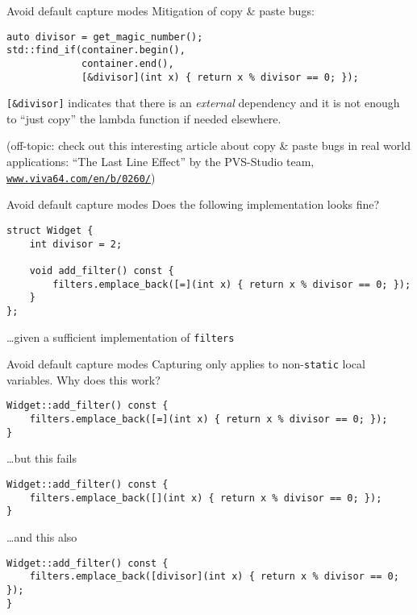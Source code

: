 \begin{frame}[fragile]{Avoid default capture modes}
    Mitigation of copy \& paste bugs:
    \begin{lstlisting}
auto divisor = get_magic_number();
std::find_if(container.begin(),
             container.end(),
             [&divisor](int x) { return x % divisor == 0; });
    \end{lstlisting}

    \texttt{[\&divisor]} indicates that there is an \textit{external} dependency and it is not enough to \enquote{just copy} the lambda function if needed elsewhere.

    {\footnotesize (off-topic: check out this interesting article about copy \& paste bugs in real world applications: \enquote{The Last Line Effect} by the PVS-Studio team, \href{https://www.viva64.com/en/b/0260/}{\texttt{www.viva64.com/en/b/0260/}})}  
\end{frame}

\begin{frame}[fragile]{Avoid default capture modes}
    Does the following implementation looks fine?
    \begin{lstlisting}
struct Widget {
    int divisor = 2;

    void add_filter() const {
        filters.emplace_back([=](int x) { return x % divisor == 0; });
    }
};
    \end{lstlisting}
    \hfill \ldots given a sufficient implementation of \texttt{filters}

\end{frame}

\begin{frame}[fragile]{Avoid default capture modes}
    Capturing only applies to non-\texttt{static} local variables. Why does this work?
    \begin{lstlisting}
Widget::add_filter() const {
    filters.emplace_back([=](int x) { return x % divisor == 0; });
}
    \end{lstlisting}
    \ldots but this fails
    \begin{lstlisting}
Widget::add_filter() const {
    filters.emplace_back([](int x) { return x % divisor == 0; });
}
    \end{lstlisting}

    \ldots and this also
    \begin{lstlisting}
Widget::add_filter() const {
    filters.emplace_back([divisor](int x) { return x % divisor == 0; });
}
    \end{lstlisting}
\end{frame}

